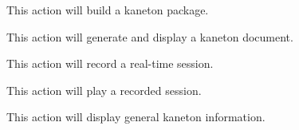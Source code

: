	{
	  This action will build a kaneton package.


	}

	{
	  This action will generate and display a kaneton document.



	}

	{
	  This action will record a real-time session.


	}

	{
	  This action will play a recorded session.


	}

	{
	  This action will display general kaneton information.

	}
